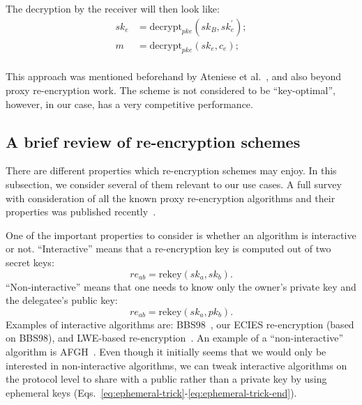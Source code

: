 \documentclass[longbibliography,nofootinbib]{revtex4-1}
\begin{document}
\begin{CJK*}{UTF8}{gbsn}

The decryption by the receiver will then look like:
\begin{align}
    sk_e &= \text{decrypt}_{pke}(sk_B, sk_e^{\prime});\\
    m &= \text{decrypt}_{pke}(sk_e, c_e);\\
\end{align}

This approach was mentioned beforehand by Ateniese et al.~\cite{AFGH}, and also beyond proxy re-encryption work.
The scheme is not considered to be ``key-optimal'', however, in our case, has a very competitive performance.

\subsection{A brief review of re-encryption schemes}

There are different properties which re-encryption schemes may enjoy.
In this subsection, we consider several of them relevant to our use cases.
A full survey with consideration of all the known proxy re-encryption algorithms and their properties was published recently~\cite{nunez2017proxy}.

One of the important properties to consider is whether an algorithm is interactive or not.
``Interactive'' means that a re-encryption key is computed out of two secret keys:
\begin{equation}
    re_{ab} = \text{rekey}(sk_a, sk_b).
\end{equation}
``Non-interactive'' means that one needs to know only the owner's private key and the delegatee's public key:
\begin{equation}
    re_{ab} = \text{rekey}(sk_a, pk_b).
\end{equation}
Examples of interactive algorithms are: BBS98~\cite{BBS98}, our ECIES re-encryption (based on BBS98), and LWE-based re-encryption~\cite{lwe-reencryption}.
An example of a ``non-interactive'' algorithm is AFGH~\cite{AFGH}.
Even though it initially seems that we would only be interested in non-interactive algorithms,
we can tweak interactive algorithms on the protocol level to share with a public rather than a private key by
using ephemeral keys (Eqs.~\ref{eq:ephemeral-trick}-\ref{eq:ephemeral-trick-end}).


\end{CJK*}
\end{document}
